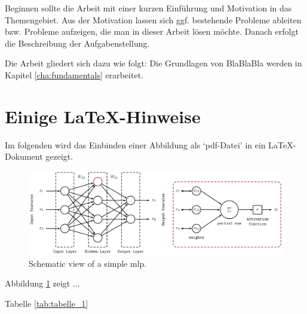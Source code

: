 Beginnen sollte die Arbeit mit einer kurzen Einführung und Motivation in das Themengebiet. Aus der Motivation lassen sich ggf. bestehende Probleme ableiten bzw. Probleme aufzeigen, die man in dieser Arbeit lösen möchte. Danach erfolgt die Beschreibung der Aufgabenstellung.

Die Arbeit gliedert sich dazu wie folgt: Die Grundlagen von BlaBlaBla 
werden in Kapitel \ref{cha:fundamentals} erarbeitet. 

\section{Einige LaTeX-Hinweise}

Im folgenden wird das Einbinden einer Abbildung als `pdf-Datei' in ein
\LaTeX-Dokument gezeigt.

\begin{figure}[H]
	\centering
	\includegraphics[width=\linewidth]{figures/example_fig.pdf}
	\caption[Schematic view of a simple MLP.]{Schematic view of a simple \gls{mlp}.}
  \label{fig:mlp}
\end{figure}

Abbildung \ref{fig:mlp} zeigt ...

Tabelle \ref{tab:tabelle_1}

